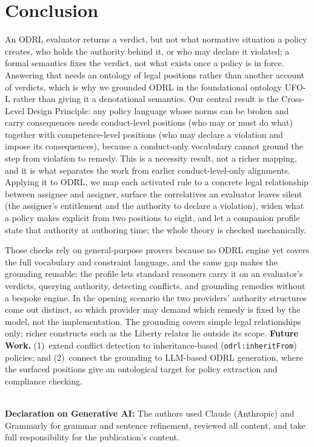 \documentclass{IOS-Book-Article}
\theoremstyle{definition}
\begin{document}
\section{Conclusion}
\label{sec:conclusion}
An ODRL evaluator returns a verdict, but not what normative situation
a policy creates, who holds the authority behind it, or who may
declare it violated; a formal semantics fixes the verdict, not what
exists once a policy is in force. Answering that needs an ontology of
legal positions rather than another account of verdicts, which is why
we grounded ODRL in the foundational ontology UFO-L rather than giving
it a denotational semantics.
Our central result is the Cross-Level Design Principle: any policy
language whose norms can be broken and carry consequences needs
conduct-level positions (who may or must do what) together with
competence-level positions (who may declare a violation and impose its
consequences), because a conduct-only vocabulary cannot ground the
step from violation to remedy. This is a necessity result, not a
richer mapping, and it is what separates the work from earlier
conduct-level-only alignments. Applying it to ODRL, we map each
activated rule to a concrete legal relationship between assignee and
assigner, surface the correlatives an evaluator leaves silent (the
assigner's entitlement and the authority to declare a violation),
widen what a policy makes explicit from two positions to eight, and
let a companion profile state that authority at authoring time; the
whole theory is checked mechanically.

Those checks rely on general-purpose provers because no ODRL engine
yet covers the full vocabulary and constraint language, and the same
gap makes the grounding reusable: the profile lets standard reasoners
carry it on an evaluator's verdicts, querying authority, detecting
conflicts, and grounding remedies without a bespoke engine. In the
opening scenario the two providers' authority structures come out
distinct, so which provider may demand which remedy is fixed by the
model, not the implementation. The grounding covers simple legal
relationships only; richer constructs such as the Liberty relator lie
outside its scope.
\noindent\textbf{Future Work.}
(1)~extend conflict detection to inheritance-based
(\texttt{odrl:inheritFrom}) policies; and (2)~connect the grounding to
LLM-based ODRL generation, where the surfaced positions give an
ontological target for policy extraction and compliance checking.

\noindent
\\
\textbf{Declaration on Generative AI:}
The authors used Claude (Anthropic) and Grammarly for grammar and sentence refinement,
reviewed all content, and take full responsibility for the publication's content.
\end{document}
